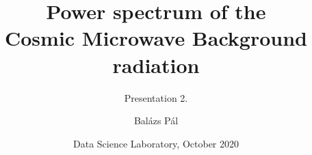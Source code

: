 \title[Cosmic Microwave Background]
{Power spectrum of the\\Cosmic Microwave Background radiation}

\subtitle{Presentation 2.}

\author[Balázs Pál]
{Balázs Pál}


\date[ELTE 2020]
{Data Science Laboratory, October 2020}

